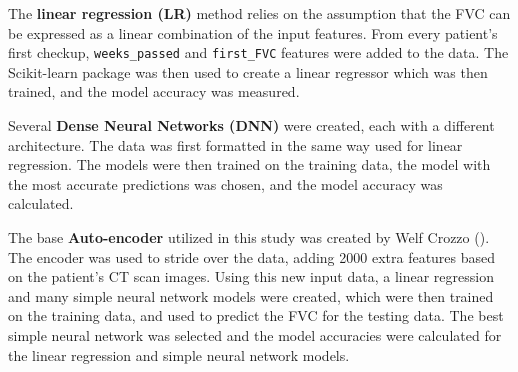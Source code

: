 \documentclass[12pt]{article}
\begin{document}




The \textbf{linear regression (LR)} method relies on the assumption that the FVC can be expressed as a linear combination of the input features. 
From every patient's first checkup, {\tt weeks\_passed} and {\tt first\_FVC} features were added to the data.
The Scikit-learn package was then used to create a linear regressor which was then trained, and the model accuracy was measured.


Several \textbf{Dense Neural Networks (DNN)} were created, each with a different architecture. 
The data was first formatted in the same way used for linear regression.
The models were then trained on the training data, the model with the most accurate predictions was chosen, and the model accuracy was calculated.


The base \textbf{Auto-encoder} utilized in this study was created by Welf Crozzo (\cite{image2vec}). 
The encoder was used to stride over the data, adding 2000 extra features based on the patient's CT scan images.
Using this new input data, a linear regression and many simple neural network models were created, which were then trained on the training data, and used to predict the FVC for the testing data.
The best simple neural network was selected and the model accuracies were calculated for the linear regression and simple neural network models.
\end{document}
